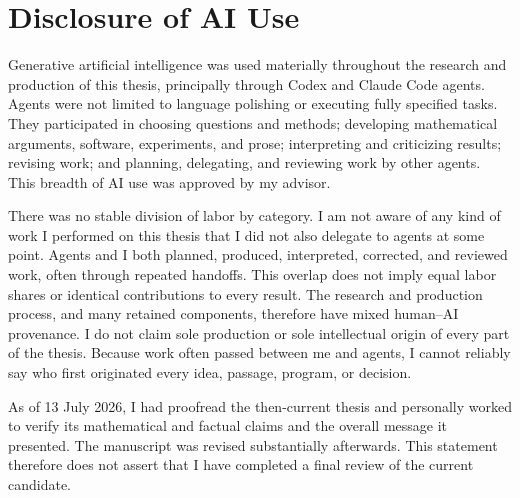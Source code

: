 \clearpage
\section*{Disclosure of AI Use}
{}

Generative artificial intelligence was used materially throughout the research
and production of this thesis, principally through Codex and Claude Code agents.
Agents were not limited to language polishing or executing fully specified
tasks.  They participated in choosing questions and methods; developing
mathematical arguments, software, experiments, and prose; interpreting and
criticizing results; revising work; and planning, delegating, and reviewing work
by other agents.  This breadth of AI use was approved by my advisor.

There was no stable division of labor by category.  I am not aware of any kind
of work I performed on this thesis that I did not also delegate to agents at
some point.  Agents and I both planned, produced, interpreted, corrected, and
reviewed work, often through repeated handoffs.  This overlap does not imply
equal labor shares or identical contributions to every result.  The research
and production process, and many retained components, therefore have mixed
human--AI provenance.  I do not claim sole production or sole intellectual
origin of every part of the thesis.  Because work often passed between me and
agents, I cannot reliably say who first originated every idea, passage,
program, or decision.

As of 13 July 2026, I had proofread the then-current thesis and personally
worked to verify its mathematical and factual claims and the overall message it
presented.  The manuscript was revised substantially afterwards.  This
statement therefore does not assert that I have completed a final review of the
current candidate.

\clearpage
